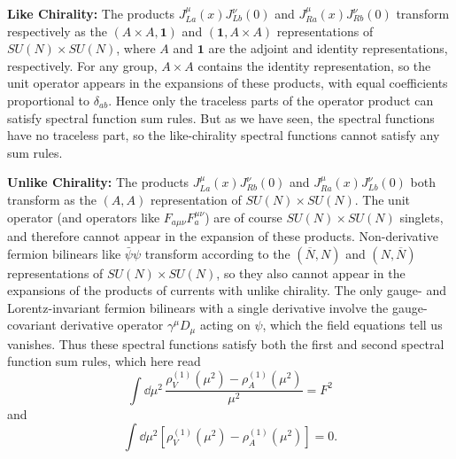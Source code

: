 \noindent\textbf{Like Chirality:}\quad
The products $J_{La}^\mu(x)J_{Lb}^\nu(0)$ and $J_{Ra}^\mu(x)J_{Rb}^\nu(0)$ transform respectively as the $(A\times A,\mathbf{1})$ and $(\mathbf{1},A\times A)$ representations of $SU(N)\times SU(N)$, where $A$ and $\mathbf{1}$ are the adjoint and identity representations, respectively. For any group, $A\times A$ contains the identity representation, so the unit operator appears in the expansions of these products, with equal coefficients proportional to $\delta_{ab}$. Hence only the traceless parts of the operator product can satisfy spectral function sum rules. But as we have seen, the spectral functions have no traceless part, so the like-chirality spectral functions cannot satisfy any sum rules.

\noindent\textbf{Unlike Chirality:}\quad
The products $J_{La}^\mu(x)J_{Rb}^\nu(0)$ and $J_{Ra}^\mu(x)J_{Lb}^\nu(0)$ both transform as the $(A,A)$ representation of $SU(N)\times SU(N)$. The unit operator (and operators like $F_{a\mu\nu}F_a^{\mu\nu}$) are of course $SU(N)\times SU(N)$ singlets, and therefore cannot appear in the expansion of these products. Non-derivative fermion bilinears like $\bar\psi\psi$ transform according to the $(\overline N,N)$ and $(N,\overline N)$ representations of $SU(N)\times SU(N)$, so they also cannot appear in the expansions of the products of currents with unlike chirality. The only gauge- and Lorentz-invariant fermion bilinears with a single derivative involve the gauge-covariant derivative operator $\gamma^\mu D_\mu$ acting on $\psi$, which the field equations tell us vanishes. Thus these spectral functions satisfy both the first and second spectral function sum rules, which here read
\begin{equation}
\int \dd\mu^2\,
\frac{\rho_V^{(1)}(\mu^2)-\rho_A^{(1)}(\mu^2)}{\mu^2}
=F^2
\tag{20.5.18}\label{eq:20.5.18}
\end{equation}
and
\begin{equation}
\int \dd\mu^2
\left[
\rho_V^{(1)}(\mu^2)-\rho_A^{(1)}(\mu^2)
\right]=0.
\tag{20.5.19}\label{eq:20.5.19}
\end{equation}

